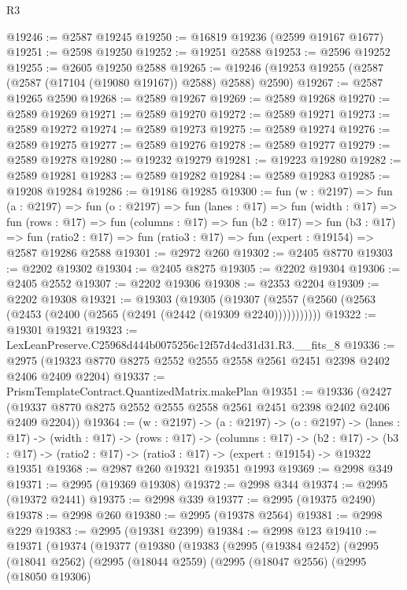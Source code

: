 \begin{lexlean}{R3}
\begin{coremodule}
@19246 := @2587 @19245
@19250 := @16819 @19236 (@2599 @19167 @1677)
@19251 := @2598 @19250
@19252 := @19251 @2588
@19253 := @2596 @19252
@19255 := @2605 @19250 @2588
@19265 := @19246 (@19253 @19255 (@2587 (@2587 (@17104 (@19080 @19167)) @2588) @2588) @2590)
@19267 := @2587 @19265 @2590
@19268 := @2589 @19267
@19269 := @2589 @19268
@19270 := @2589 @19269
@19271 := @2589 @19270
@19272 := @2589 @19271
@19273 := @2589 @19272
@19274 := @2589 @19273
@19275 := @2589 @19274
@19276 := @2589 @19275
@19277 := @2589 @19276
@19278 := @2589 @19277
@19279 := @2589 @19278
@19280 := @19232 @19279
@19281 := @19223 @19280
@19282 := @2589 @19281
@19283 := @2589 @19282
@19284 := @2589 @19283
@19285 := @19208 @19284
@19286 := @19186 @19285
@19300 := fun (w : @2197) =>
  fun (a : @2197) =>
  fun (o : @2197) =>
  fun (lanes : @17) =>
  fun (width : @17) =>
  fun (rows : @17) =>
  fun (columns : @17) =>
  fun (b2 : @17) =>
  fun (b3 : @17) =>
  fun (ratio2 : @17) => fun (ratio3 : @17) => fun (expert : @19154) => @2587 @19286 @2588
@19301 := @2972 @260
@19302 := @2405 @8770
@19303 := @2202 @19302
@19304 := @2405 @8275
@19305 := @2202 @19304
@19306 := @2405 @2552
@19307 := @2202 @19306
@19308 := @2353 @2204
@19309 := @2202 @19308
@19321 := @19303
    (@19305 (@19307 (@2557 (@2560 (@2563 (@2453 (@2400 (@2565 (@2491 (@2442 (@19309 @2240)))))))))))
@19322 := @19301 @19321
@19323 := LexLeanPreserve.C25968d444b0075256c12f57d4cd31d31.R3.__fits_8
@19336 := @2975 (@19323 @8770 @8275 @2552 @2555 @2558 @2561 @2451 @2398 @2402 @2406 @2409 @2204)
@19337 := PrismTemplateContract.QuantizedMatrix.makePlan
@19351 := @19336
    (@2427 (@19337 @8770 @8275 @2552 @2555 @2558 @2561 @2451 @2398 @2402 @2406 @2409 @2204))
@19364 := (w : @2197) ->
  (a : @2197) ->
  (o : @2197) ->
  (lanes : @17) ->
  (width : @17) ->
  (rows : @17) ->
  (columns : @17) ->
  (b2 : @17) -> (b3 : @17) -> (ratio2 : @17) -> (ratio3 : @17) -> (expert : @19154) -> @19322 @19351
@19368 := @2987 @260 @19321 @19351 @1993
@19369 := @2998 @349
@19371 := @2995 (@19369 @19308)
@19372 := @2998 @344
@19374 := @2995 (@19372 @2441)
@19375 := @2998 @339
@19377 := @2995 (@19375 @2490)
@19378 := @2998 @260
@19380 := @2995 (@19378 @2564)
@19381 := @2998 @229
@19383 := @2995 (@19381 @2399)
@19384 := @2998 @123
@19410 := @19371
    (@19374
      (@19377
        (@19380
          (@19383
            (@2995
              (@19384 @2452)
              (@2995
                (@18041 @2562)
                (@2995
                  (@18044 @2559)
                  (@2995
                    (@18047 @2556)
                    (@2995
                      (@18050 @19306)

\end{coremodule}
\end{lexlean}
